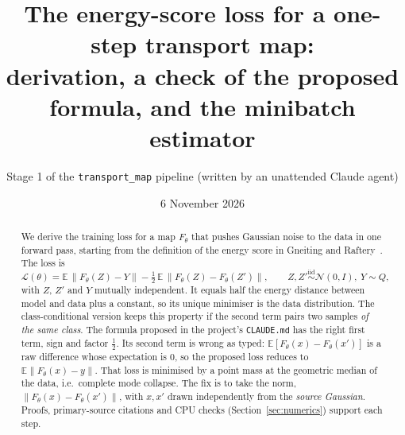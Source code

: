 \documentclass[11pt]{article}
\title{The energy-score loss for a one-step transport map:\\
derivation, a check of the proposed formula, and the minibatch estimator}
\author{Stage 1 of the \texttt{transport\_map} pipeline (written by an unattended Claude agent)}
\date{6 November 2026}
\theoremstyle{definition}
\theoremstyle{remark}
\newcommand{\E}{\mathbb{E}}
\newcommand{\N}{\mathcal{N}}
\newcommand{\norm}[1]{\lVert #1\rVert}
\begin{document}
\maketitle

\begin{abstract}
We derive the training loss for a map $F_\theta$ that pushes Gaussian noise to the data in one forward pass,
starting from the definition of the energy score in Gneiting and Raftery~\cite{GR2007}. The loss is
\[
\mathcal L(\theta)=\E\,\norm{F_\theta(Z)-Y}-\tfrac12\,\E\,\norm{F_\theta(Z)-F_\theta(Z')},\qquad Z,Z'\overset{\text{iid}}{\sim}\N(0,I),\ Y\sim Q,
\]
with $Z$, $Z'$ and $Y$ mutually independent. It equals half the energy distance between model and data plus a
constant, so its unique minimiser is the data distribution. The class-conditional version keeps this property
if the second term pairs two samples \emph{of the same class}. The formula proposed in the project's
\texttt{CLAUDE.md} has the right first term, sign and factor $\tfrac12$. Its second term is wrong as
typed: $\E[F_\theta(x)-F_\theta(x')]$ is a raw difference whose expectation is $0$, so the proposed loss
reduces to $\E\norm{F_\theta(x)-y}$. That loss is minimised by a point mass at the geometric median of the
data, i.e.\ complete mode collapse. The fix is to take the norm, $\norm{F_\theta(x)-F_\theta(x')}$, with $x,x'$
drawn independently from the \emph{source Gaussian}. Proofs, primary-source citations and CPU checks
(Section~\ref{sec:numerics}) support each step.
\end{abstract}

\tableofcontents

\end{document}
